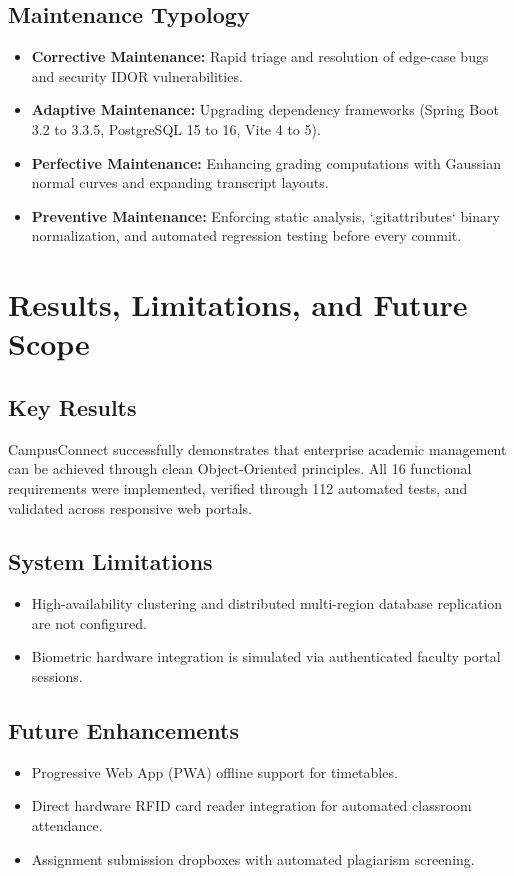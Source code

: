 \documentclass[12pt,a4paper,oneside]{report}
\begin{document}
\section{Maintenance Typology}
\begin{itemize}
    \item \textbf{Corrective Maintenance:} Rapid triage and resolution of edge-case bugs and security IDOR vulnerabilities.
    \item \textbf{Adaptive Maintenance:} Upgrading dependency frameworks (Spring Boot 3.2 to 3.3.5, PostgreSQL 15 to 16, Vite 4 to 5).
    \item \textbf{Perfective Maintenance:} Enhancing grading computations with Gaussian normal curves and expanding transcript layouts.
    \item \textbf{Preventive Maintenance:} Enforcing static analysis, `.gitattributes` binary normalization, and automated regression testing before every commit.
\end{itemize}

\chapter{Results, Limitations, and Future Scope}

\section{Key Results}
CampusConnect successfully demonstrates that enterprise academic management can be achieved through clean Object-Oriented principles. All 16 functional requirements were implemented, verified through 112 automated tests, and validated across responsive web portals.

\section{System Limitations}
\begin{itemize}
    \item High-availability clustering and distributed multi-region database replication are not configured.
    \item Biometric hardware integration is simulated via authenticated faculty portal sessions.
\end{itemize}

\section{Future Enhancements}
\begin{itemize}
    \item Progressive Web App (PWA) offline support for timetables.
    \item Direct hardware RFID card reader integration for automated classroom attendance.
    \item Assignment submission dropboxes with automated plagiarism screening.
\end{itemize}
\end{document}
